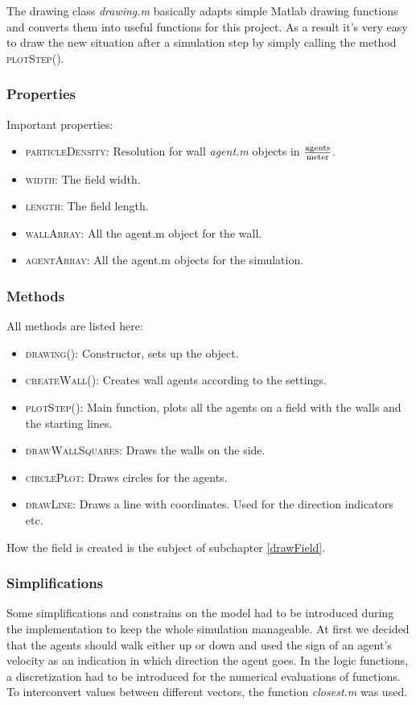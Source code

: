\noi The drawing class \textit{drawing.m} basically adapts simple Matlab drawing functions and converts them into useful functions for this project. As a result it's very easy to draw the new situation after a simulation step by simply calling the method \textsc{plotStep()}.
\subsubsection{Properties}
Important properties:
\begin{itemize}
\item \textsc{particleDensity}: Resolution for wall \textit{agent.m} objects in $\frac{\text{agents}}{\text{meter}}$.
\item \textsc{width}: The field width.
\item \textsc{length}: The field length.
\item \textsc{wallArray}: All the agent.m object for the wall.
\item \textsc{agentArray}: All the agent.m objects for the simulation.
\end{itemize}
\subsubsection{Methods}
All methods are listed here:
\begin{itemize}
\item \textsc{drawing()}: Constructor, sets up the object.
\item \textsc{createWall()}: Creates wall agents according to the settings.
\item \textsc{plotStep()}: Main function, plots all the agents on a field with the walls and the starting lines. 
\item \textsc{drawWallSquares}: Draws the walls on the side.
\item \textsc{circlePlot}: Draws circles for the agents.
\item \textsc{drawLine}: Draws a line with coordinates. Used for the direction indicators etc.
\end{itemize}
\noi How the field is created is the subject of subchapter \ref{drawField}.

\subsubsection{Simplifications}
Some simplifications and constrains on the model had to be introduced during the implementation to keep the whole simulation manageable. At first we decided that the agents should walk either up or down and used the sign of an agent's velocity as an indication in which direction the agent goes. In the logic functions, a discretization had to be introduced for the numerical evaluations of functions. To interconvert values between different vectors, the function \textit{closest.m} was used.\\

